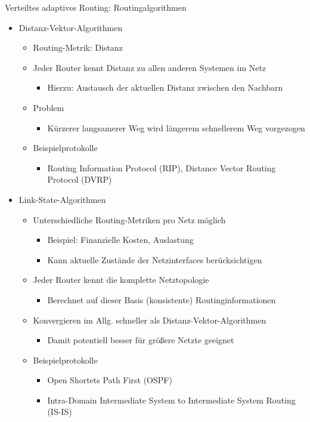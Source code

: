       Verteiltes adaptives Routing: Routingalgorithmen
      \begin{itemize}
        \item Distanz-Vektor-Algorithmen
          \begin{itemize}
            \item Routing-Metrik: Distanz
            \item Jeder Router kennt Distanz zu allen anderen Systemen im Netz
              \begin{itemize}
                \item Hierzu: Austausch der aktuellen Distanz zwischen den Nachbarn
              \end{itemize}
            \item Problem
              \begin{itemize}
                \item Kürzerer langsamerer Weg wird längerem schnellerem Weg vorgezogen
              \end{itemize}
            \item Beispielprotokolle
              \begin{itemize}
                \item Routing Information Protocol (RIP), Distance Vector Routing Protocol (DVRP)
              \end{itemize}
          \end{itemize}
        \item Link-State-Algorithmen
          \begin{itemize}
            \item Unterschiedliche Routing-Metriken pro Netz möglich
              \begin{itemize}
                \item Beispiel: Finanzielle Kosten, Auslastung
                \item Kann aktuelle Zustände der Netzinterfaces berücksichtigen
              \end{itemize}
            \item Jeder Router kennt die komplette Netztopologie
              \begin{itemize}
                \item Berechnet auf dieser Basis (konsistente) Routinginformationen
              \end{itemize}
            \item Konvergieren im Allg. schneller als Distanz-Vektor-Algorithmen
              \begin{itemize}
                \item Damit potentiell besser für größere Netzte geeignet
              \end{itemize}
            \item Beispielprotokolle
              \begin{itemize}
                \item Open Shortets Path First (OSPF)
                \item Intra-Domain Intermediate System to Intermediate System Routing (IS-IS)
              \end{itemize}
          \end{itemize}
      \end{itemize}
